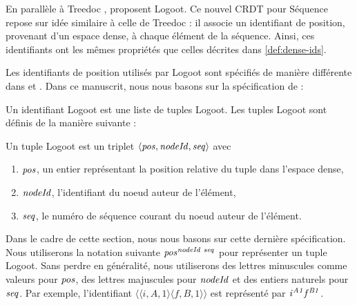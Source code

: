 En parallèle à Treedoc \cite{2009-treedoc-preguica}, \textcite{2009-logoot-weiss} proposent Logoot.
Ce nouvel \ac{CRDT} pour Séquence repose sur idée similaire à celle de Treedoc : il associe un identifiant de position, provenant d'un espace dense, à chaque élément de la séquence.
Ainsi, ces identifiants ont les mêmes propriétés que celles décrites dans \autoref{def:dense-ids}.

Les identifiants de position utilisés par Logoot sont spécifiés de manière différente dans \cite{2009-logoot-weiss} et \cite{2010-logoot-undo-weiss}.
Dans ce manuscrit, nous nous basons sur la spécification de \cite{2010-logoot-undo-weiss} :
\begin{definition}
  Un identifiant Logoot est une liste de tuples Logoot.
  Les tuples Logoot sont définis de la manière suivante :
  \begin{subdefinition}
    Un tuple Logoot est un triplet $\langle \mathit{pos},\mathit{nodeId},\mathit{seq} \rangle$ avec
    \begin{enumerate}
      \item $\mathit{pos}$, un entier représentant la position relative du tuple dans l'espace dense,
      \item $\mathit{nodeId}$, l'identifiant du noeud auteur de l'élément,
      \item $\mathit{seq}$, le numéro de séquence courant du noeud auteur de l'élément.
    \end{enumerate}
  \end{subdefinition}
\end{definition}

Dans le cadre de cette section, nous nous basons sur cette dernière spécification.
Nous utiliserons la notation suivante $\mathit{pos}^{\mathit{nodeId~seq}}_{\mathit{}}$ pour représenter un tuple Logoot.
Sans perdre en généralité, nous utiliserons des lettres minuscules comme valeurs pour $\mathit{pos}$, des lettres majuscules pour $\mathit{nodeId}$ et des entiers naturels pour $\mathit{seq}$.
Par exemple, l'identifiant $\langle \langle i,A,1 \rangle \langle f,B,1 \rangle \rangle$ est représenté par $\mathit{i}^{\mathit{A1}}_{\mathit{}}\mathit{f}^{\mathit{B1}}_{\mathit{}}$.


